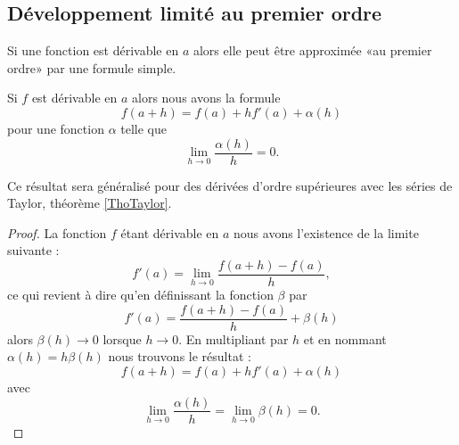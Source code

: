 \subsection{Développement limité au premier ordre}

Si une fonction est dérivable en \( a\) alors elle peut être approximée «au premier ordre» par une formule simple.
\begin{proposition}  \label{PropUTenzfQ}
    Si \( f\) est dérivable en \( a\) alors nous avons la formule
    \begin{equation}
        f(a+h)=f(a)+hf'(a)+\alpha(h)
    \end{equation}
    pour une fonction \( \alpha\) telle que
    \begin{equation}
        \lim_{h\to 0} \frac{ \alpha(h) }{ h }=0.
    \end{equation}
\end{proposition}
Ce résultat sera généralisé pour des dérivées d'ordre supérieures avec les séries de Taylor, théorème \ref{ThoTaylor}.

\begin{proof}
    La fonction \( f\) étant dérivable en \( a\) nous avons l'existence de la limite suivante :
    \begin{equation}
        f'(a)=\lim_{h\to 0} \frac{ f(a+h)-f(a) }{ h },
    \end{equation}
    ce qui revient à dire qu'en définissant la fonction \( \beta\) par
    \begin{equation}
        f'(a)=\frac{ f(a+h)-f(a) }{ h }+\beta(h)
    \end{equation}
    alors \( \beta(h)\to 0\) lorsque \( h\to 0\). En multipliant par \( h\) et en nommant \( \alpha(h)=h\beta(h)\) nous trouvons le résultat :
    \begin{equation}
        f(a+h)=f(a)+hf'(a)+\alpha(h)
    \end{equation}
    avec 
    \begin{equation}
        \lim_{h\to 0} \frac{ \alpha(h) }{ h }=\lim_{h\to 0} \beta(h)=0.
    \end{equation}
\end{proof}

